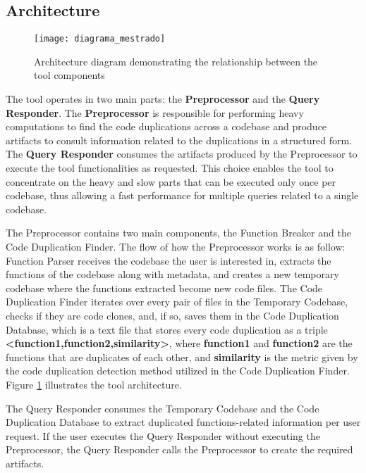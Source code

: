 \documentclass[conference]{IEEEtran}
\begin{document}
\subsection{Architecture}

\begin{figure}[!t]
\centering
\texttt{[image: diagrama\_mestrado]}
\caption{Architecture diagram demonstrating the relationship between the tool components}
\label{fig:diagram}
\end{figure}

The tool operates in two main parts: the \textbf{Preprocessor} and the \textbf{Query Responder}. 
The \textbf{Preprocessor} is responsible for performing heavy computations to find the code 
duplications across a codebase and produce artifacts to consult information related to the 
duplications in a structured form. The \textbf{Query Responder} consumes the artifacts produced 
by the Preprocessor to execute the tool functionalities as requested. This choice enables the 
tool to concentrate on the heavy and slow parts that can be executed only once per codebase, 
thus allowing a fast performance for multiple queries related to a single codebase.

The Preprocessor contains two main components, the Function Breaker and the Code Duplication Finder. 
The flow of how the Preprocessor works is as follow: Function Parser receives the codebase the user is interested in,
extracts the functions of the codebase along with metadata, and creates a new temporary codebase where the functions extracted become new code files. 
The Code Duplication Finder iterates over every pair of files in the Temporary Codebase, checks if they are code clones, and, 
if so, saves them in the Code Duplication Database, which is a text file that stores every code duplication as a triple 
\textbf{<function1,function2,similarity>}, where \textbf{function1} and \textbf{function2} are the functions that are duplicates 
of each other, and \textbf{similarity} is the metric given by the code duplication detection method utilized in the Code Duplication Finder.
Figure \ref{fig:diagram} illustrates the tool architecture.

The Query Responder consumes the Temporary Codebase and the Code Duplication Database to extract duplicated 
functions-related information per user request. If the user executes the Query Responder without executing the 
Preprocessor, the Query Responder calls the Preprocessor to create the required artifacts.
\end{document}
